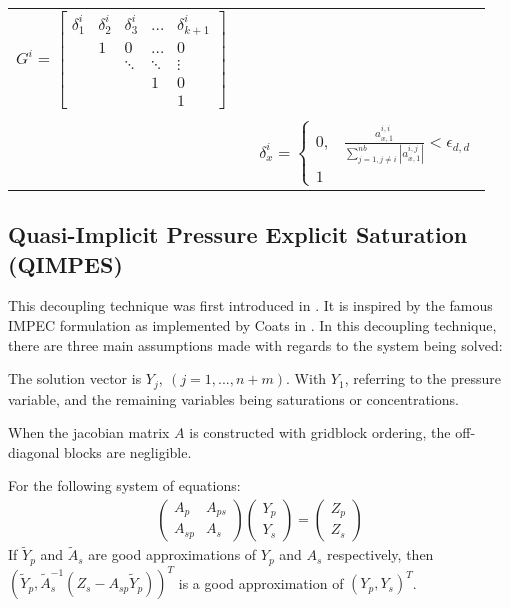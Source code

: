 \begin{table}[h!]
\begin{tabularx}{\linewidth}{c||l||c}
$G^{i} = \begin{bmatrix}
	\delta_{1}^{i} &\delta_{2}^{i}&\delta_{3}^{i}& \dots &\delta_{k+1}^{i} \\
 & 1 & 0 & \dots & 0 \\
 &  & \ddots & \ddots & \vdots \\
 &  &  & 1 & 0 \\
 &  &  &  & 1 
\end{bmatrix} $\\
	&&\\
	&&
$\delta_{x}^{i} = \begin{cases} 
0, & \frac{a_{x,1}^{i,i}}{\sum_{j=1,j\neq i}^{nb} |a_{x,1}^{i,j}|} < \epsilon_{d,d} \\  
1 & 
     \end{cases} $\\
    \bottomrule
\end{tabularx}
\end{table}

\subsection{Quasi-Implicit Pressure Explicit Saturation (QIMPES)}
This decoupling technique was first introduced in \cite{IPARSdecoupling}. It is inspired by the famous IMPEC formulation as implemented by Coats in \cite{impescoats}.
In this decoupling technique, there are three main assumptions made with regards to the system being solved:
\begin{assumption}
	The solution vector is ${Y_{j}}, \ (j=1,...,n+m)$. With $Y_{1}$, referring to the pressure variable, and the remaining variables being
	saturations or concentrations.
\end{assumption}

\begin{assumption}
	When the jacobian matrix $A$ is constructed with gridblock ordering, the off-diagonal blocks are negligible.
\end{assumption}

\begin{assumption}
	For the following system of equations:
	\begin{align}
		\begin{pmatrix}
			A_{p}&A_{ps}\\
			A_{sp}&A_{s}
		\end{pmatrix} 
		\begin{pmatrix}
			Y_{p}\\
			Y_{s}
		\end{pmatrix} 
		= 
		\begin{pmatrix}
			Z_{p}\\
			Z_{s}
		\end{pmatrix} 
	\end{align}
	If $\tilde{Y}_{p}$ and $\tilde{A}_{s}$ are good approximations of $Y_{p}$ and $A_{s}$ respectively,
	then $(\tilde{Y}_{p}, \tilde{A}_{s}^{-1}(Z_{s}-A_{sp}\tilde{Y}_{p}))^{T}$ is a good approximation of $(Y_{p}, Y_{s})^{T}$.
\end{assumption}


